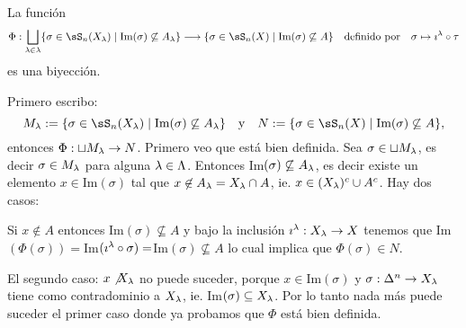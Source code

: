 \begin{ejercicio}\label{ej:65}
  La funci\'on
  \[
    \Phi:\bigsqcup_{\la\in\lambda}\{\sigma\in\sS_n(X_{\la})\mid \text{Im}(\sigma)\not\subseteq A_{\la}\} \lra
    \{\sigma\in\sS_n(X)\mid \text{Im}(\sigma)\not\subseteq A\} \quad\text{definido por}\quad
    \sigma \mapsto \imath^{\la}\circ \tau
  \]
  es una biyecci\'on.
\end{ejercicio}
	Primero escribo:
	\[
		M_{\la}:=\{\sigma\in\sS_n(X_{\la})\mid \text{Im}(\sigma)\not\subseteq A_{\la}\} \quad\text{y}\quad
		N:=\{\sigma\in\sS_n(X)\mid \text{Im}(\sigma)\not\subseteq A\},
	\]
	entonces $\Phi:\sqcup M_{\lambda}\rightarrow N$. Primero veo que est\'a bien definida. Sea $\sigma\in\sqcup M_{\lambda}$, es
	decir $\sigma\in M_{\lambda}$ para alguna $\lambda\in\Lambda$. Entonces Im$(\sigma)\not\subseteq A_{\lambda}$, es decir
	existe un elemento $x\in$Im$(\sigma)$ tal que $x\not\in A_{\lambda}=X_{\lambda}\cap A$, ie. $x\in(X_{\lambda})^c \cup A^c$.
	Hay dos casos:

	Si $x\not\in A$ entonces Im$(\sigma)\not\subseteq A$ y bajo la inclusi\'on $\imath^{\lambda}:X_{\lambda}\rightarrow X$ tenemos
	que Im$(\Phi(\sigma))=$Im$(\imath^{\lambda}\circ\sigma)=$Im$(\sigma)\not\subseteq A$ lo cual implica que $\Phi(\sigma)\in N$.

	El segundo caso: $x\not X_{\lambda}$ no puede suceder, porque $x\in$Im$(\sigma)$ y $\sigma:\Delta^n\rightarrow X_{\lambda}$ tiene
	como contradominio a $X_{\lambda}$, ie. Im$(\sigma)\subseteq X_{\lambda}$. Por lo tanto nada m\'as puede suceder el primer
	caso donde ya probamos que $\Phi$ est\'a bien definida.

